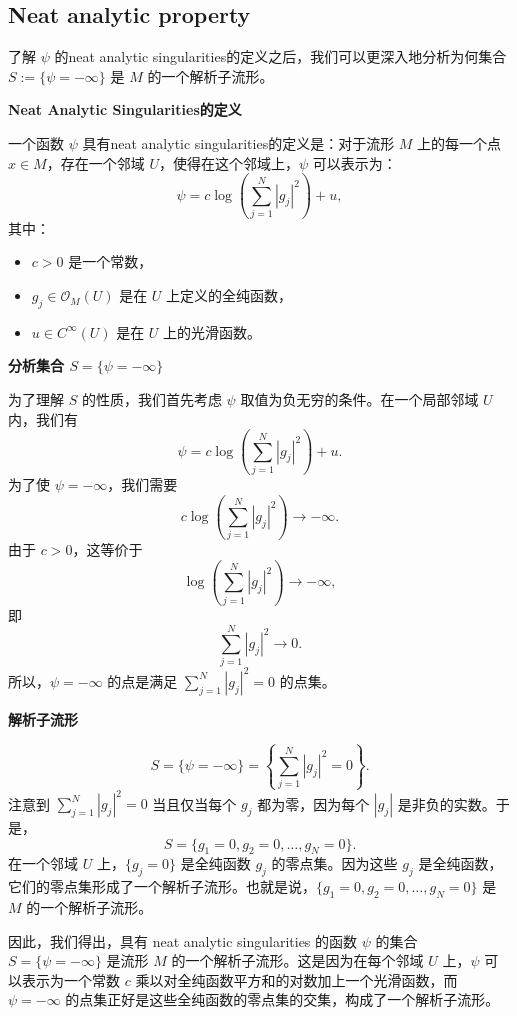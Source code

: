 \documentclass[lang=cn,12pt,fontset=none,a4paper]{beautybook}
\begin{document}
\subsection{Neat analytic property}

了解 \(\psi\) 的neat analytic singularities的定义之后，我们可以更深入地分析为何集合 \( S := \{ \psi = -\infty \} \) 是 \( M \) 的一个解析子流形。

\textbf{Neat Analytic Singularities的定义}

一个函数 \(\psi\) 具有neat analytic singularities的定义是：对于流形 \(M\) 上的每一个点 \(x \in M\)，存在一个邻域 \(U\)，使得在这个邻域上，\(\psi\) 可以表示为：
\[
   \psi = c \log \left( \sum_{j=1}^N |g_j|^2 \right) + u,
\]
其中：
\begin{itemize}
   \item \(c > 0\) 是一个常数，
   \item \(g_j \in \mathcal{O}_M(U)\) 是在 \(U\) 上定义的全纯函数，
   \item \(u \in C^\infty(U)\) 是在 \(U\) 上的光滑函数。
\end{itemize}

\textbf{分析集合 \( S = \{ \psi = -\infty \} \)}

为了理解 \( S \) 的性质，我们首先考虑 \(\psi\) 取值为负无穷的条件。在一个局部邻域 \(U\) 内，我们有
\[
   \psi = c \log \left( \sum_{j=1}^N |g_j|^2 \right) + u.
\]
为了使 \(\psi = -\infty\)，我们需要
\[
   c \log \left( \sum_{j=1}^N |g_j|^2 \right) \to -\infty.
\]
由于 \(c > 0\)，这等价于
\[
   \log \left( \sum_{j=1}^N |g_j|^2 \right) \to -\infty,
\]
即
\[
   \sum_{j=1}^N |g_j|^2 \to 0.
\]
所以，\(\psi = -\infty\) 的点是满足 \( \sum_{j=1}^N |g_j|^2 = 0 \) 的点集。

\textbf{解析子流形}

\[
   S = \{ \psi = -\infty \} = \left\{ \sum_{j=1}^N |g_j|^2 = 0 \right\}.
\]
注意到 \(\sum_{j=1}^N |g_j|^2 = 0\) 当且仅当每个 \(g_j\) 都为零，因为每个 \(|g_j|\) 是非负的实数。于是，
\[
   S = \{ g_1 = 0, g_2 = 0, \ldots, g_N = 0 \}.
\]
在一个邻域 \(U\) 上，\(\{g_j = 0\}\) 是全纯函数 \(g_j\) 的零点集。因为这些 \(g_j\) 是全纯函数，它们的零点集形成了一个解析子流形。也就是说，\(\{g_1 = 0, g_2 = 0, \ldots, g_N = 0\}\) 是 \(M\) 的一个解析子流形。


因此，我们得出，具有 {\rodondo neat analytic singularities} 的函数 \(\psi\) 的集合 \( S = \{ \psi = -\infty \} \) 是流形 \(M\) 的一个解析子流形。这是因为在每个邻域 \(U\) 上，\(\psi\) 可以表示为一个常数 \(c\) 乘以对全纯函数平方和的对数加上一个光滑函数，而 \(\psi = -\infty\) 的点集正好是这些全纯函数的零点集的交集，构成了一个解析子流形。
\end{document}
